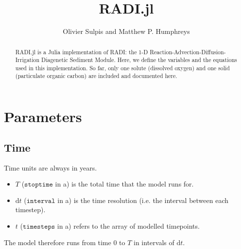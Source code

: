 \documentclass[a4paper]{article}
\newcommand{\D}[1]{\mathrm{d}#1}
\newcommand{\code}[1]{\texttt{#1}}
\begin{document}
\title{RADI.jl}
\author{Olivier Sulpis and Matthew P. Humphreys}

\maketitle

\begin{abstract}
RADI.jl is a Julia implementation of RADI: the 1-D Reaction-Advection-Diffusion-Irrigation Diagenetic Sediment Module. Here, we define the variables and the equations used in this implementation. So far, only one solute (dissolved oxygen) and one solid (particulate organic carbon) are included and documented here.
\end{abstract}

%
%
%
%
%

\section{Parameters}

\subsection{Time}

Time units are always in years.
\begin{itemize}
  \item $T$ ($\code{stoptime}$ in a) is the total time that the model runs for.
  \item $\D{t}$ ($\code{interval}$ in a) is the time resolution (i.e. the interval between each timestep).
  \item $t$ ($\code{timesteps}$ in a) refers to the array of modelled timepoints.
\end{itemize}
The model therefore runs from time $0$ to $T$ in intervals of $\D{t}$.
\end{document}
